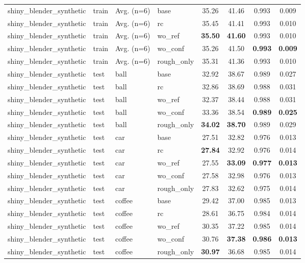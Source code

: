 \begin{table}[t]
{\begin{tabular}{llllcccc}
shiny\_blender\_synthetic & train & Avg. (n=6) & base & 35.26 & 41.46 & 0.993 & 0.009 \\
shiny\_blender\_synthetic & train & Avg. (n=6) & rc & 35.45 & 41.41 & 0.993 & 0.010 \\
shiny\_blender\_synthetic & train & Avg. (n=6) & wo\_ref & \textbf{35.50} & \textbf{41.60} & 0.993 & 0.010 \\
shiny\_blender\_synthetic & train & Avg. (n=6) & wo\_conf & 35.26 & 41.50 & \textbf{0.993} & \textbf{0.009} \\
shiny\_blender\_synthetic & train & Avg. (n=6) & rough\_only & 35.31 & 41.36 & 0.993 & 0.010 \\
\midrule
shiny\_blender\_synthetic & test & ball & base & 32.92 & 38.67 & 0.989 & 0.027 \\
shiny\_blender\_synthetic & test & ball & rc & 32.86 & 38.69 & 0.988 & 0.031 \\
shiny\_blender\_synthetic & test & ball & wo\_ref & 32.37 & 38.44 & 0.988 & 0.031 \\
shiny\_blender\_synthetic & test & ball & wo\_conf & 33.36 & 38.54 & \textbf{0.989} & \textbf{0.025} \\
shiny\_blender\_synthetic & test & ball & rough\_only & \textbf{34.02} & \textbf{38.70} & 0.989 & 0.029 \\
shiny\_blender\_synthetic & test & car & base & 27.51 & 32.82 & 0.976 & 0.013 \\
shiny\_blender\_synthetic & test & car & rc & \textbf{27.84} & 32.92 & 0.976 & 0.014 \\
shiny\_blender\_synthetic & test & car & wo\_ref & 27.55 & \textbf{33.09} & \textbf{0.977} & \textbf{0.013} \\
shiny\_blender\_synthetic & test & car & wo\_conf & 27.58 & 32.98 & 0.976 & 0.013 \\
shiny\_blender\_synthetic & test & car & rough\_only & 27.83 & 32.62 & 0.975 & 0.014 \\
shiny\_blender\_synthetic & test & coffee & base & 29.42 & 37.00 & 0.985 & 0.013 \\
shiny\_blender\_synthetic & test & coffee & rc & 28.61 & 36.75 & 0.984 & 0.014 \\
shiny\_blender\_synthetic & test & coffee & wo\_ref & 30.35 & 37.22 & 0.985 & 0.014 \\
shiny\_blender\_synthetic & test & coffee & wo\_conf & 30.76 & \textbf{37.38} & \textbf{0.986} & \textbf{0.013} \\
shiny\_blender\_synthetic & test & coffee & rough\_only & \textbf{30.97} & 36.68 & 0.985 & 0.014 \\

\end{tabular}}
\end{table}
